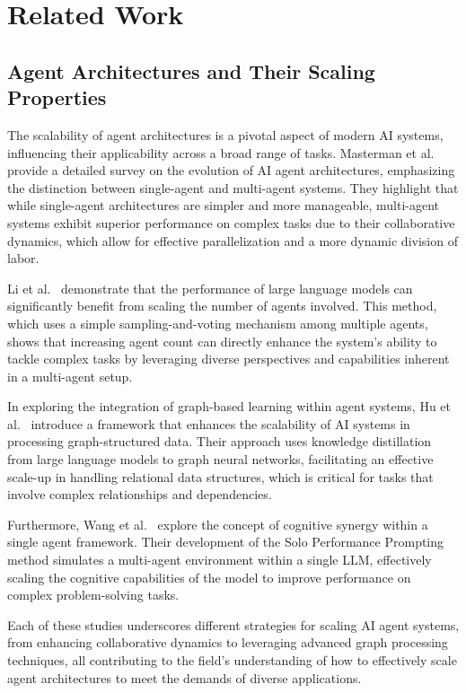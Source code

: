 \section{Related Work}
\subsection{Agent Architectures and Their Scaling Properties}
The scalability of agent architectures is a pivotal aspect of modern AI systems, influencing their applicability across a broad range of tasks. Masterman et al.~ \cite{masterman2024landscape} provide a detailed survey on the evolution of AI agent architectures, emphasizing the distinction between single-agent and multi-agent systems. They highlight that while single-agent architectures are simpler and more manageable, multi-agent systems exhibit superior performance on complex tasks due to their collaborative dynamics, which allow for effective parallelization and a more dynamic division of labor.

Li et al.~\cite{li2024agents} demonstrate that the performance of large language models can significantly benefit from scaling the number of agents involved. This method, which uses a simple sampling-and-voting mechanism among multiple agents, shows that increasing agent count can directly enhance the system's ability to tackle complex tasks by leveraging diverse perspectives and capabilities inherent in a multi-agent setup.

In exploring the integration of graph-based learning within agent systems, Hu et al.~\cite{hu2024large} introduce a framework that enhances the scalability of AI systems in processing graph-structured data. Their approach uses knowledge distillation from large language models to graph neural networks, facilitating an effective scale-up in handling relational data structures, which is critical for tasks that involve complex relationships and dependencies.

Furthermore, Wang et al.~\cite{wang2024unleashing} explore the concept of cognitive synergy within a single agent framework. Their development of the Solo Performance Prompting method simulates a multi-agent environment within a single LLM, effectively scaling the cognitive capabilities of the model to improve performance on complex problem-solving tasks.

Each of these studies underscores different strategies for scaling AI agent systems, from enhancing collaborative dynamics to leveraging advanced graph processing techniques, all contributing to the field's understanding of how to effectively scale agent architectures to meet the demands of diverse applications.


